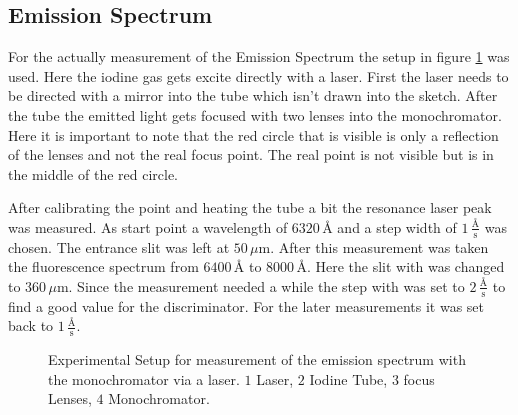 \subsection{Emission Spectrum}
For the actually measurement of the Emission Spectrum the setup in figure \ref{figEMS} was used. Here the iodine gas gets excite directly with a laser. First the laser needs to be directed with a mirror into the tube which isn't drawn into the sketch. After the tube the emitted light gets focused with two lenses into the monochromator. Here it is important to note that the red circle that is visible is only a reflection of the lenses and not the real focus point. The real point is not visible but is in the middle of the red circle. \par
After calibrating the point and heating the tube a bit the resonance laser peak was measured. As start point a wavelength of $6320\,\text{\AA}$ and a step width of $1\,\frac{\text{\AA}}{\text{s}}$ was chosen. The entrance slit was left at $50\,\mu$m.
After this measurement was taken the fluorescence spectrum from $6400\,\text{\AA}$ to $8000\,\text{\AA}$. Here the slit with was changed to $360\,\mu$m. Since the measurement needed a while the step with was set to $2\,\frac{\text{\AA}}{\text{s}}$ to find a good value for the discriminator. For the later measurements it was set back to $1\,\frac{\text{\AA}}{\text{s}}$.
\begin{figure}[ht]
	\centering
	\caption[Experimental Setup 3]{Experimental Setup for measurement of the emission spectrum with the monochromator via a laser. $1$ Laser, $2$ Iodine Tube, $3$ focus Lenses, $4$ Monochromator.}
	\label{figEMS}
\end{figure}